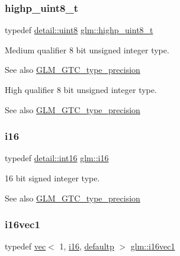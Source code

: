 \subsubsection{\texorpdfstring{highp\+\_\+uint8\+\_\+t}{highp\_uint8\_t}}
{\footnotesize\ttfamily typedef \hyperlink{namespaceglm_1_1detail_aef2588f97d090cc19fbbe0c74fe17c8f}{detail\+::uint8} \hyperlink{group__gtc__type__precision_ga9ba529fcc75b82d23da979f0ce6e4518}{glm\+::highp\+\_\+uint8\+\_\+t}}

Medium qualifier 8 bit unsigned integer type. \begin{DoxySeeAlso}{See also}
\hyperlink{group__gtc__type__precision}{G\+L\+M\+\_\+\+G\+T\+C\+\_\+type\+\_\+precision}
\end{DoxySeeAlso}
High qualifier 8 bit unsigned integer type. \begin{DoxySeeAlso}{See also}
\hyperlink{group__gtc__type__precision}{G\+L\+M\+\_\+\+G\+T\+C\+\_\+type\+\_\+precision} 
\end{DoxySeeAlso}
\mbox{\label{group__gtc__type__precision_ga35e5542ca05b29cc256fdafb8503d1fd}} 
\subsubsection{\texorpdfstring{i16}{i16}}
{\footnotesize\ttfamily typedef \hyperlink{namespaceglm_1_1detail_a375938874ca4f0a0982ec6373b56117b}{detail\+::int16} \hyperlink{group__gtc__type__precision_ga35e5542ca05b29cc256fdafb8503d1fd}{glm\+::i16}}

16 bit signed integer type. \begin{DoxySeeAlso}{See also}
\hyperlink{group__gtc__type__precision}{G\+L\+M\+\_\+\+G\+T\+C\+\_\+type\+\_\+precision} 
\end{DoxySeeAlso}
\mbox{\label{group__gtc__type__precision_ga51ac9cc5aa60aa41bf37ccbf900db94f}} 
\subsubsection{\texorpdfstring{i16vec1}{i16vec1}}
{\footnotesize\ttfamily typedef \hyperlink{structglm_1_1vec}{vec}$<$ 1, \hyperlink{group__gtc__type__precision_ga35e5542ca05b29cc256fdafb8503d1fd}{i16}, \hyperlink{namespaceglm_a36ed105b07c7746804d7fdc7cc90ff25a9d21ccd8b5a009ec7eb7677befc3bf51}{defaultp} $>$ \hyperlink{group__gtc__type__precision_ga51ac9cc5aa60aa41bf37ccbf900db94f}{glm\+::i16vec1}}

